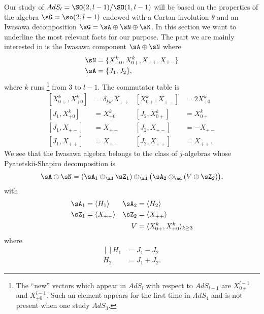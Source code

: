 Our study of $AdS_l=\SO(2,l-1)/\SO(1,l-1)$ will be based on the properties of the algebra $\sG=\so(2,l-1)$ endowed with a Cartan involution $\theta$ and an Iwasawa decomposition $\sG=\sA\oplus\sN\oplus\sK$. In this section we want to underline the most relevant facts for our purpose. The part we are mainly interested in is the Iwasawa component $\sA\oplus\sN$ where
\begin{subequations}		\label{LONGEqLeANEnDimAlg}
	\begin{align}
		\sN & =\{ X^{k}_{+0},X^{k}_{0+},X_{++},X_{+-} \} \\
		\sA & =\{ J_1, J_2\},
	\end{align}
\end{subequations}
where $k$ runs %
\footnote{The ``new'' vectors which appear in $AdS_l$ with respect to $AdS_{l-1}$ are $X_{0\pm}^{l-1}$ and $X_{\pm 0}^{l-1}$. Such an element appears for the first time in $AdS_4$ and is not present when one study $AdS_3$.} %
from $3$ to $l-1$. The commutator table is
\begin{subequations}  \label{LONGEqTableSOIwa}
	\begin{align}
		[X_{0+}^{k},X_{+0}^{k'}] & =\delta_{kk'}X_{++} & [X_{0+}^{k},X_{+-}] & =2X_{+0}^{k} \\
		[ J_1,X_{+0}^{k}]        & =X_{+0}^{k}         & [ J_2,X_{0+}^{k}]   & =X_{0+}^{k}  \\
		[ J_1,X_{+-}]            & =X_{+-}             & [ J_2,X_{+-}]       & =-X_{+-}     \\
		[ J_1,X_{++}]            & =X_{++}             & [ J_2,X_{++}]       & =X_{++}.
	\end{align}
\end{subequations}
We see that the Iwasawa algebra belongs to the class of $j$-algebras whose Pyatetskii-Shapiro decomposition is
\begin{equation}
	\sA\oplus\sN=(\sA_1\oplus_{\ad}\sZ_1)\oplus_{\ad}\big( \sA_2\oplus_{\ad}(V\oplus \sZ_2) \big),
\end{equation}
with
\begin{subequations}
	\begin{align}
		\sA_1 & =\langle H_1\rangle    & \sA_2 & =\langle H_2\rangle                             \\
		\sZ_1 & =\langle X_{+-}\rangle & \sZ_2 & =\langle X_{++}\rangle                          \\
		      &                        & V     & =\langle X_{0+}^{k},X_{+0}^{k}\rangle_{k\geq 3}
	\end{align}
\end{subequations}
where
\begin{equation}
	\begin{aligned}[]
		H_1 & =J_1-J_2  \\
		H_2 & =J_1+J_2.
	\end{aligned}
\end{equation}

